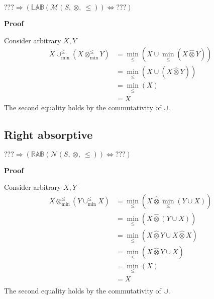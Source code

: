 \documentclass[10pt]{article}
\newcommand{\propname}[1]{{\mathbb{#1}}}
\newcommand{\minlift}{\otimes_{\min}^{\leq}}
\newcommand{\lift}{\hat{\otimes}}
\newcommand{\minunion}{\cup_{\min}^{\leq}}
\newcommand{\proof}{\vspace{1em} \textbf{Proof} \vspace{1em}}
\begin{document}
$??? \Rightarrow (\propname{LAB}(\mathcal{M}(S,\ \otimes,\ \leq)) \Leftrightarrow ???)$

\proof

Consider arbitrary $X, Y$
\begin{align*}
X \minunion (X \minlift Y) 	& = \min_\leq(X \cup \min_\leq(X \lift Y)) \\
							& = \min_\leq(X \cup (X \lift Y)) \\
							& = \min_\leq(X) \\
							& = X
\end{align*}
The second equality holds by the commutativity of $\cup$.



\subsection{Right absorptive}

$??? \Rightarrow (\propname{RAB}(\mathcal{N}(S,\ \otimes,\ \leq)) \Leftrightarrow ???)$

\proof

Consider arbitrary $X, Y$
\begin{align*}
X \minlift (Y \minunion X) 	& = \min_\leq(X \lift \min_\leq(Y \cup X)) \\
							& = \min_\leq(X \lift (Y \cup X)) \\
							& = \min_\leq(X \lift Y \cup X \lift X) \\
							& = \min_\leq(X \lift Y \cup X) \\
							& = \min_\leq(X) \\
							& = X \\
\end{align*}
The second equality holds by the commutativity of $\cup$.
\end{document}
